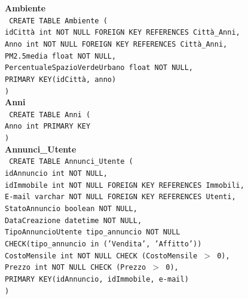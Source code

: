 \documentclass[a4paper,12pt]{report}
\begin{document}
                \noindent
                {\large \textbf{Ambiente}} \\
                \texttt{
                    CREATE TABLE Ambiente ( \\
                    \null\quad\quad idCittà int NOT NULL FOREIGN KEY REFERENCES Città\_Anni, \\
                    \null\quad\quad Anno int NOT NULL FOREIGN KEY REFERENCES Città\_Anni, \\
                    \null\quad\quad PM2.5media                      float           NOT NULL, \\
                    \null\quad\quad PercentualeSpazioVerdeUrbano    float           NOT NULL, \\
                    \null\quad\quad PRIMARY KEY(idCittà, anno) \\
                    )
                } \\

                \noindent
                {\large \textbf{Anni}} \\
                \texttt{
                    CREATE TABLE Anni ( \\
                    \null\quad\quad Anno    int     PRIMARY KEY \\
                    )
                } \\

                \noindent
                {\large \textbf{Annunci\_Utente}} \\
                \texttt{
                    CREATE TABLE Annunci\_Utente ( \\
                    \null\quad\quad idAnnuncio          int             NOT NULL, \\ 
                    \null\quad\quad idImmobile int NOT NULL FOREIGN KEY REFERENCES Immobili, \\
                    \null\quad\quad E-mail varchar NOT NULL FOREIGN KEY REFERENCES Utenti, \\
                    \null\quad\quad StatoAnnuncio       boolean         NOT NULL, \\
                    \null\quad\quad DataCreazione       datetime        NOT NULL, \\
                    \null\quad\quad TipoAnnuncioUtente  tipo\_annuncio  NOT NULL \\
                            \null\qquad\qquad CHECK(tipo\_annuncio in ('Vendita', 'Affitto')) \\
                    \null\quad\quad CostoMensile        int             NOT NULL CHECK (CostoMensile $>$ 0), \\
                    \null\quad\quad Prezzo              int             NOT NULL CHECK (Prezzo $>$ 0),\\
                    \null\quad\quad PRIMARY KEY(idAnnuncio, idImmobile, e-mail) \\
                    )
                } \\
\end{document}
